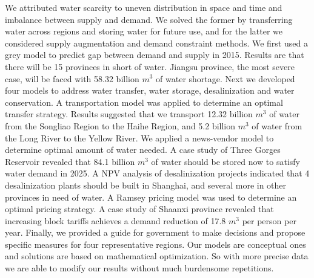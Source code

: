 We attributed water scarcity to uneven distribution in space and time and imbalance between supply and demand. We solved the former by transferring water across regions and storing water for future use, and for the latter we considered supply augmentation and demand constraint methods.
We first used a grey model to predict gap between demand and supply in 2015. Results are that there will be 15 provinces in short of water. Jiangsu province, the most severe case, will be faced with 58.32 billion $m^3$ of water shortage.
Next we developed four models to address water transfer, water storage, desalinization and water conservation. A transportation model was applied to determine an optimal transfer strategy. Results suggested that we transport 12.32 billion $m^3$ of water from the Songliao Region to the Haihe Region, and 5.2 billion $m^3$ of water from the Long River to the Yellow River. We applied a news-vendor model to determine optimal amount of water needed. A case study of Three Gorges Reservoir revealed that 84.1 billion $m^3$ of water should be stored now to satisfy water demand in 2025. A NPV analysis of desalinization projects indicated that 4 desalinization plants should be built in Shanghai, and several more in other provinces in need of water. A Ramsey pricing model was used to determine an optimal pricing strategy. A case study of Shaanxi province revealed that increasing block tariffs achieves a demand reduction of 17.8 $m^3$ per person per year.
Finally, we provided a guide for government to make decisions and propose specific measures for four representative regions. 
Our models are conceptual ones and solutions are based on mathematical optimization. So with more precise data we are able to modify our results without much burdensome repetitions.

